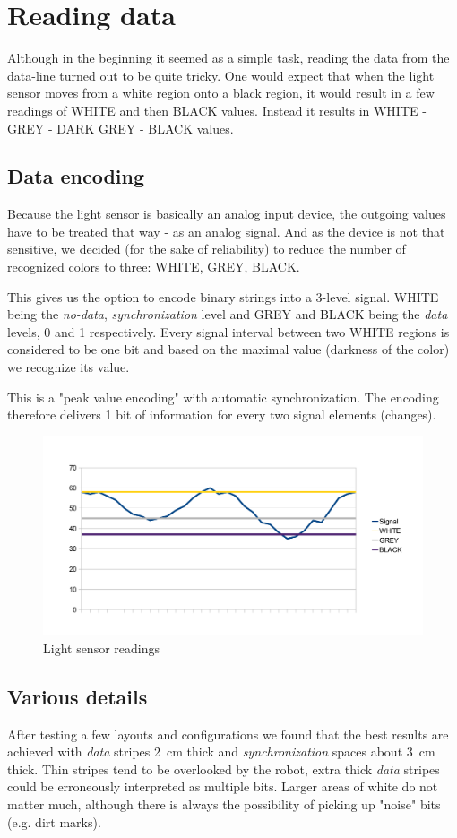 \section{Reading data}
Although in the beginning it seemed as a simple task, reading the data
from the data-line turned out to be quite tricky. One would expect that
when the light sensor moves from a white region onto a black region,
it would result in a few readings of WHITE and then BLACK values. Instead
it results in WHITE - GREY - DARK GREY - BLACK values.

\subsection{Data encoding}
Because the light sensor is basically an analog input device, the outgoing
values have to be treated that way - as an analog signal. And as the device
is not that sensitive, we decided (for the sake of reliability) to reduce
the number of recognized colors to three: WHITE, GREY, BLACK.

This gives us the option to encode binary strings into a 3-level signal.
WHITE being the \textit{no-data}, \textit{synchronization} level and GREY
and BLACK being the \textit{data} levels, 0 and 1 respectively. Every
signal interval between two WHITE regions is considered to be one bit and
based on the maximal value (darkness of the color) we recognize its value.

This is a "peak value encoding" with automatic synchronization.
The encoding therefore delivers 1 bit of information for every two signal
elements (changes).

\begin{figure}[h]
\begin{center}
\includegraphics[width=0.75\linewidth]{light_signal.pdf}
\end{center}
\caption{Light sensor readings}
\end{figure}

\subsection{Various details}
After testing a few layouts and configurations we found that the best
results are achieved with \textit{data} stripes 2~cm thick and
\textit{synchronization} spaces about 3~cm thick. Thin stripes
tend to be overlooked by the robot, extra thick \textit{data} stripes
could be erroneously interpreted as multiple bits. Larger areas of white
do not matter much, although there is always the possibility of picking
up "noise" bits (e.g. dirt marks).

